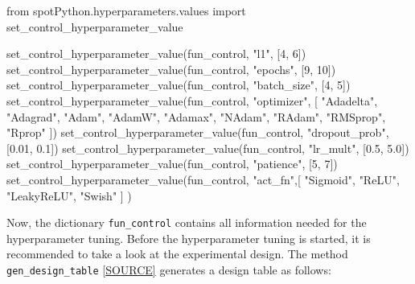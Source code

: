 \documentclass[
  letterpaper,
  DIV=11,
  numbers=noendperiod]{scrreprt}
\newenvironment{Shaded}{\begin{snugshade}}{\end{snugshade}}
\newcommand{\DecValTok}[1]{\textcolor[rgb]{0.68,0.00,0.00}{#1}}
\newcommand{\FloatTok}[1]{\textcolor[rgb]{0.68,0.00,0.00}{#1}}
\newcommand{\ImportTok}[1]{\textcolor[rgb]{0.00,0.46,0.62}{#1}}
\newcommand{\NormalTok}[1]{\textcolor[rgb]{0.00,0.23,0.31}{#1}}
\newcommand{\StringTok}[1]{\textcolor[rgb]{0.13,0.47,0.30}{#1}}
\begin{document}
\begin{Shaded}
\begin{Highlighting}[]
\ImportTok{from}\NormalTok{ spotPython.hyperparameters.values }\ImportTok{import}\NormalTok{ set\_control\_hyperparameter\_value}

\NormalTok{set\_control\_hyperparameter\_value(fun\_control, }\StringTok{"l1"}\NormalTok{, [}\DecValTok{4}\NormalTok{, }\DecValTok{6}\NormalTok{])}
\NormalTok{set\_control\_hyperparameter\_value(fun\_control, }\StringTok{"epochs"}\NormalTok{, [}\DecValTok{9}\NormalTok{, }\DecValTok{10}\NormalTok{])}
\NormalTok{set\_control\_hyperparameter\_value(fun\_control, }\StringTok{"batch\_size"}\NormalTok{, [}\DecValTok{4}\NormalTok{, }\DecValTok{5}\NormalTok{])}
\NormalTok{set\_control\_hyperparameter\_value(fun\_control, }\StringTok{"optimizer"}\NormalTok{, [}
                \StringTok{"Adadelta"}\NormalTok{,}
                \StringTok{"Adagrad"}\NormalTok{,}
                \StringTok{"Adam"}\NormalTok{,}
                \StringTok{"AdamW"}\NormalTok{,}
                \StringTok{"Adamax"}\NormalTok{,                }
                \StringTok{"NAdam"}\NormalTok{,}
                \StringTok{"RAdam"}\NormalTok{,}
                \StringTok{"RMSprop"}\NormalTok{,}
                \StringTok{"Rprop"}
\NormalTok{            ])}
\NormalTok{set\_control\_hyperparameter\_value(fun\_control, }\StringTok{"dropout\_prob"}\NormalTok{, [}\FloatTok{0.01}\NormalTok{, }\FloatTok{0.1}\NormalTok{])}
\NormalTok{set\_control\_hyperparameter\_value(fun\_control, }\StringTok{"lr\_mult"}\NormalTok{, [}\FloatTok{0.5}\NormalTok{, }\FloatTok{5.0}\NormalTok{])}
\NormalTok{set\_control\_hyperparameter\_value(fun\_control, }\StringTok{"patience"}\NormalTok{, [}\DecValTok{5}\NormalTok{, }\DecValTok{7}\NormalTok{])}
\NormalTok{set\_control\_hyperparameter\_value(fun\_control, }\StringTok{"act\_fn"}\NormalTok{,[}
                \StringTok{"Sigmoid"}\NormalTok{,}
                \StringTok{"ReLU"}\NormalTok{,}
                \StringTok{"LeakyReLU"}\NormalTok{,}
                \StringTok{"Swish"}
\NormalTok{            ] )}
\end{Highlighting}
\end{Shaded}

Now, the dictionary \texttt{fun\_control} contains all information
needed for the hyperparameter tuning. Before the hyperparameter tuning
is started, it is recommended to take a look at the experimental design.
The method \texttt{gen\_design\_table}
\href{https://github.com/sequential-parameter-optimization/spotPython/blob/main/src/spotPython/utils/eda.py}{{[}SOURCE{]}}
generates a design table as follows:
\end{document}
